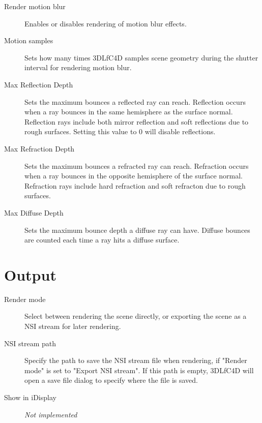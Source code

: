 \documentclass{book}
\begin{document}
\begin{description}
\item[Render motion blur] Enables or disables rendering of motion blur effects. 
\item[Motion samples] Sets how many times 3DLfC4D samples scene geometry during the shutter interval for rendering motion blur. 
\item[Max Reflection Depth] Sets the maximum bounces a reflected ray can reach. Reflection occurs when a ray bounces in the same hemisphere as the surface normal. Reflection rays include both mirror reflection and soft reflections due to rough surfaces. Setting this value to 0 will disable reflections.
\item[Max Refraction Depth] Sets the maximum bounces a refracted ray can reach. Refraction occurs when a ray bounces in the opposite hemisphere of the surface normal. Refraction rays include hard refraction and soft refracton due to rough surfaces.
\item[Max Diffuse Depth] Sets the maximum bounce depth a diffuse ray can have. Diffuse bounces are counted each time a ray hits a diffuse surface.
\end{description}



\section{Output}
\begin{description}
\item[Render mode] Select between rendering the scene directly, or exporting the scene as a NSI stream for later rendering. 
\item[NSI stream path] Specify the path to save the NSI stream file when rendering, if "Render mode" is set to "Export NSI stream". If this path is empty, 3DLfC4D will open a save file dialog to specify where the file is saved. 
\item[Show in iDisplay] \emph{Not implemented}
\end{description}
\end{document}
